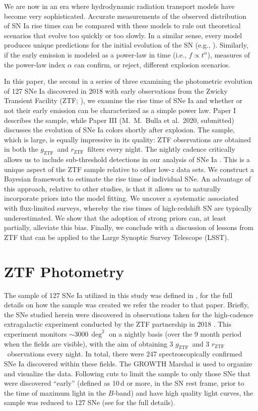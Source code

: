 \documentclass[twocolumn]{./aastex63}
\newcommand{\rztf}{$r_\mathrm{ZTF}$}
\newcommand{\gztf}{$g_\mathrm{ZTF}$}
\begin{document}
We are now in an era where hydrodynamic radiation transport models have become
very sophisticated. Accurate measurements of the observed distribution of SN Ia
rise times can be compared with these models to rule out theoretical scenarios
that evolve too quickly or too slowly. In a similar sense, every model produces
unique predictions for the initial evolution of the SN (e.g.,
\citealt{Noebauer17}). Similarly, if the early emission is modeled as a
power-law in time (i.e., $f \propto t^\alpha$), measures of the power-law index
$\alpha$ can confirm, or reject, different explosion scenarios.

In this paper, the second in a series of three examining the photometric
evolution of 127 SNe Ia discovered in 2018 with early observations from the
Zwicky Transient Facility (ZTF; \citealt{Bellm19,Graham19}), we examine the rise
time of SNe Ia and whether or not their early emission can be characterized as a
simple power law. Paper I \citep{Yao19} describes the sample, while Paper III
(M.\ M.~Bulla et al.\ 2020, submitted) discusses the evolution of SNe Ia colors
shortly after explosion. The sample, which is large, is equally impressive in
its quality: ZTF observations are obtained in both the \gztf\ and \rztf\ filters
every night. The nightly cadence critically allows us to include sub-threshold
detections in our analysis of SNe Ia \citep{Yao19}. This is a unique aspect of
the ZTF sample relative to other low-$z$ data sets. We construct a Bayesian
framework to estimate the rise time of individual SNe. An advantage of this
approach, relative to other studies, is that it allows us to naturally
incorporate priors into the model fitting. We uncover a systematic associated
with flux-limited surveys, whereby the rise times of high-redshift SN are
typically underestimated. We show that the adoption of strong priors can, at
least partially, alleviate this bias. Finally, we conclude with a discussion of
lessons from ZTF that can be applied to the Large Synoptic Survey Telescope
(LSST).

\section{ZTF Photometry}\label{sec:ztf}

The sample of 127 SNe Ia utilized in this study was defined in \citet{Yao19},
for the full details on how the sample was created we refer the reader to that
paper. Briefly, the SNe studied herein were discovered in observations taken for
the high-cadence extragalactic experiment conducted by the ZTF partnership in
2018 \citep{Bellm19a}. This experiment monitors $\sim$3000\,$\deg^2$ on a
nightly basis (over the 9 month period when the fields are visible), with the
aim of obtaining 3 \gztf\ and 3 \rztf\ observations every night. In total, there
were 247 spectroscopically confirmed SNe Ia discovered within these fields. The
GROWTH Marshal \citep{Kasliwal19} is used to organize and visualize the data.
Following cuts to limit the sample to only those SNe that were discovered
``early'' (defined as 10\,d or more, in the SN rest frame, prior to the time of
maximum light in the $B$-band) and have high quality light curves, the sample
was reduced to 127 SNe (see \citealt{Yao19} for the full details).
\end{document}

